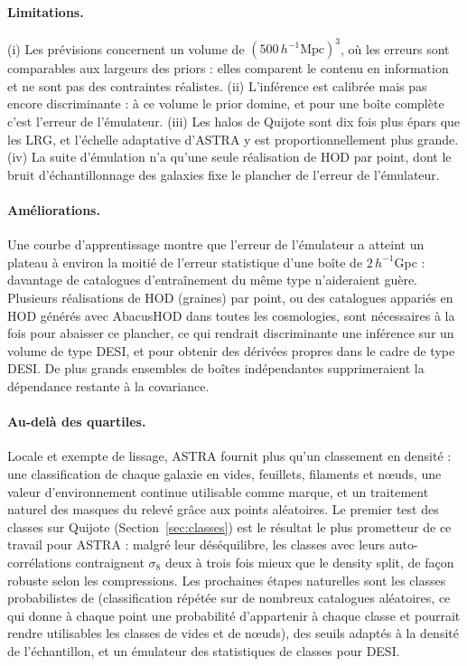 \documentclass[11pt,twocolumn]{article}
\newcommand{\Mpch}{\,h^{-1}\mathrm{Mpc}}
\begin{document}
\paragraph{Limitations.} (i) Les prévisions concernent un volume de $(500\Mpch)^3$, où les erreurs sont comparables aux largeurs des priors : elles comparent le contenu en information et ne sont pas des contraintes réalistes. (ii) L'inférence est calibrée mais pas encore discriminante : à ce volume le prior domine, et pour une boîte complète c'est l'erreur de l'émulateur. (iii) Les halos de Quijote sont dix fois plus épars que les LRG, et l'échelle adaptative d'ASTRA y est proportionnellement plus grande. (iv) La suite d'émulation n'a qu'une seule réalisation de HOD par point, dont le bruit d'échantillonnage des galaxies fixe le plancher de l'erreur de l'émulateur.

\paragraph{Améliorations.} Une courbe d'apprentissage montre que l'erreur de l'émulateur a atteint un plateau à environ la moitié de l'erreur statistique d'une boîte de $2\,h^{-1}$Gpc : davantage de catalogues d'entraînement du même type n'aideraient guère. Plusieurs réalisations de HOD (graines) par point, ou des catalogues appariés en HOD générés avec AbacusHOD dans toutes les cosmologies, sont nécessaires à la fois pour abaisser ce plancher, ce qui rendrait discriminante une inférence sur un volume de type DESI, et pour obtenir des dérivées propres dans le cadre de type DESI. De plus grands ensembles de boîtes indépendantes supprimeraient la dépendance restante à la covariance.

\paragraph{Au-delà des quartiles.} Locale et exempte de lissage, ASTRA fournit plus qu'un classement en densité : une classification de chaque galaxie en vides, feuillets, filaments et nœuds, une valeur d'environnement continue utilisable comme marque, et un traitement naturel des masques du relevé grâce aux points aléatoires. Le premier test des classes sur Quijote (Section~\ref{sec:classes}) est le résultat le plus prometteur de ce travail pour ASTRA : malgré leur déséquilibre, les classes avec leurs auto-corrélations contraignent $\sigma_8$ deux à trois fois mieux que le density split, de façon robuste selon les compressions. Les prochaines étapes naturelles sont les classes probabilistes de \cite{ASTRA} (classification répétée sur de nombreux catalogues aléatoires, ce qui donne à chaque point une probabilité d'appartenir à chaque classe et pourrait rendre utilisables les classes de vides et de nœuds), des seuils adaptés à la densité de l'échantillon, et un émulateur des statistiques de classes pour DESI.
\end{document}
